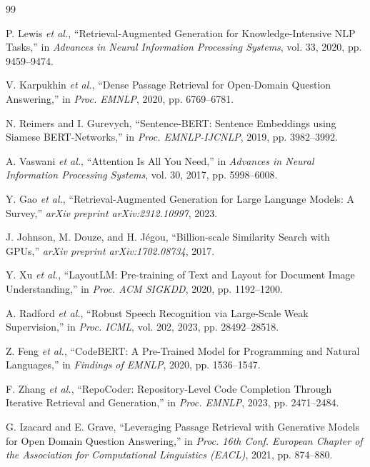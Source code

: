 \documentclass[conference]{IEEEtran}
\begin{document}
\balance
\begin{thebibliography}{99}

 P. Lewis \emph{et al.}, ``Retrieval-Augmented Generation for Knowledge-Intensive NLP Tasks,'' in \emph{Advances in Neural Information Processing Systems}, vol. 33, 2020, pp. 9459--9474.

 V. Karpukhin \emph{et al.}, ``Dense Passage Retrieval for Open-Domain Question Answering,'' in \emph{Proc. EMNLP}, 2020, pp. 6769--6781.

 N. Reimers and I. Gurevych, ``Sentence-BERT: Sentence Embeddings using Siamese BERT-Networks,'' in \emph{Proc. EMNLP-IJCNLP}, 2019, pp. 3982--3992.

 A. Vaswani \emph{et al.}, ``Attention Is All You Need,'' in \emph{Advances in Neural Information Processing Systems}, vol. 30, 2017, pp. 5998--6008.

 Y. Gao \emph{et al.}, ``Retrieval-Augmented Generation for Large Language Models: A Survey,'' \emph{arXiv preprint arXiv:2312.10997}, 2023.

 J. Johnson, M. Douze, and H. J\'egou, ``Billion-scale Similarity Search with GPUs,'' \emph{arXiv preprint arXiv:1702.08734}, 2017.

 Y. Xu \emph{et al.}, ``LayoutLM: Pre-training of Text and Layout for Document Image Understanding,'' in \emph{Proc. ACM SIGKDD}, 2020, pp. 1192--1200.

 A. Radford \emph{et al.}, ``Robust Speech Recognition via Large-Scale Weak Supervision,'' in \emph{Proc. ICML}, vol. 202, 2023, pp. 28492--28518.

 Z. Feng \emph{et al.}, ``CodeBERT: A Pre-Trained Model for Programming and Natural Languages,'' in \emph{Findings of EMNLP}, 2020, pp. 1536--1547.

 F. Zhang \emph{et al.}, ``RepoCoder: Repository-Level Code Completion Through Iterative Retrieval and Generation,'' in \emph{Proc. EMNLP}, 2023, pp. 2471--2484.

 G. Izacard and E. Grave, ``Leveraging Passage Retrieval with Generative Models for Open Domain Question Answering,'' in \emph{Proc. 16th Conf. European Chapter of the Association for Computational Linguistics (EACL)}, 2021, pp. 874--880.


\end{thebibliography}
\end{document}
